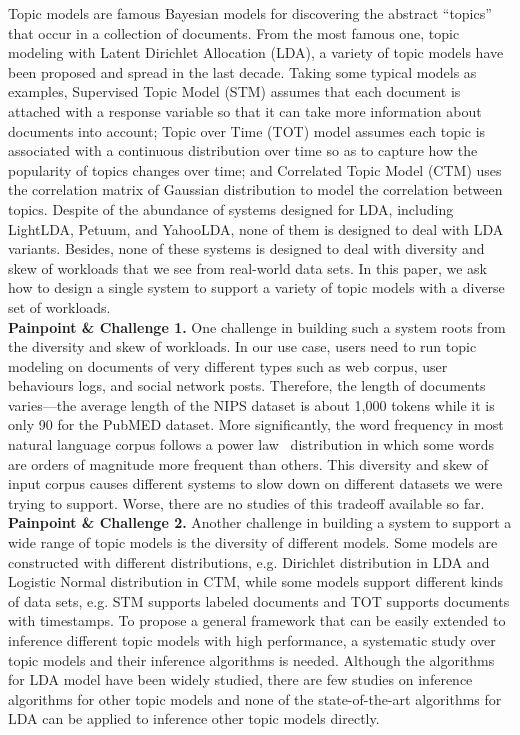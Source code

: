 \documentclass[10pt,journal,cspaper,compsoc]{IEEEtran}
\begin{document}
Topic models are famous Bayesian models for discovering
the abstract ``topics'' that occur in a collection of
documents.
From the most famous one, topic modeling with Latent
Dirichlet Allocation (LDA), a variety of topic models have 
been proposed and spread in the last decade. Taking some typical models as examples, Supervised Topic Model (STM)
assumes that each document is attached with a response
variable so that it can take more 
information about documents into account; Topic over Time (TOT) model assumes each topic is associated with a continuous distribution over time so as to capture
how the popularity of topics changes over time; and 
Correlated Topic Model (CTM) uses the correlation matrix of Gaussian distribution to model the correlation between topics. Despite of the abundance of systems designed for 
LDA, including LightLDA, Petuum, and YahooLDA, none of 
them is designed to deal with LDA variants.
Besides, none of these systems is designed to deal with diversity and skew of workloads that we see from real-world data sets.
In this paper, we ask how to design a single system to support a variety of topic models with a diverse set of workloads. \\

\noindent
\textbf{Painpoint \& Challenge 1.}
One challenge in building such a system roots from
the diversity and skew of workloads. In our use case, users
need to run topic modeling on documents of
very different types such as web corpus, user behaviours 
logs, and social network posts.
Therefore, the length of documents varies---the average length of the NIPS dataset is about 1,000
tokens while it is only 90 for the PubMED dataset.
More significantly,  the word frequency in most 
natural language corpus follows a power law~\cite{mikolov2013distributed} distribution in which
some words are orders of magnitude more frequent
than others.
This diversity and skew of input corpus causes different
systems to slow down on different datasets we
were trying to support. Worse, there are no
studies of this tradeoff available so far.
\\

\noindent
\textbf{Painpoint \& Challenge 2.}
Another challenge in building a system to support a wide range of
topic models is the diversity of different models.
Some models are constructed with different distributions, e.g.
Dirichlet distribution in LDA and Logistic Normal distribution in CTM, while
some models support different kinds of data sets, e.g. STM
supports labeled documents and TOT supports  documents with timestamps.
To propose a general framework that can be
easily extended to inference different topic models 
with high performance, a systematic study over topic models
and their inference algorithms is needed. Although the
algorithms for LDA model have been widely studied, there 
are few studies on inference algorithms for other topic models and none
of the state-of-the-art algorithms for LDA can be applied to
inference other topic models directly.
\\
\end{document}
